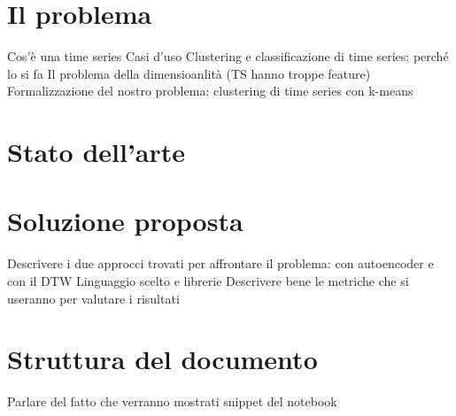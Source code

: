 \section{Il problema}
Cos'è una time series
Casi d'uso
Clustering e classificazione di time series: perché lo si fa
Il problema della dimensioanlità (TS hanno troppe feature)
Formalizzazione del nostro problema: clustering di time series con k-means

\section{Stato dell'arte}

\section{Soluzione proposta}
Descrivere i due approcci trovati per affrontare il problema: con autoencoder e con il DTW
Linguaggio scelto e librerie
Descrivere bene le metriche che si useranno per valutare i risultati

\section{Struttura del documento}
Parlare del fatto che verranno mostrati snippet del notebook